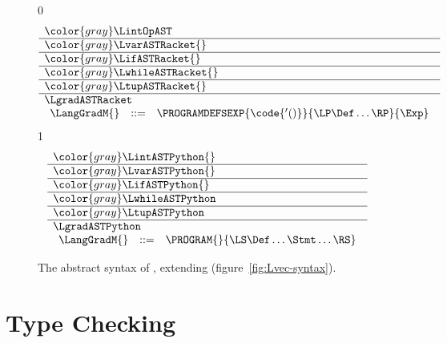 \documentclass[7x10]{TimesAPriori_MIT}%
\newcommand{\gray}[1]{{\color{gray} #1}}
\def\racketEd{0}
\def\pythonEd{1}
\def\edition{1}
\newcommand{\pythonColor}[0]{}
\numberwithin{theorem}{chapter}
\numberwithin{definition}{chapter}
\numberwithin{equation}{chapter}
\begin{document}
\begin{figure}[tbp]
\centering
\begin{tcolorbox}[colback=white]
    \small
{\if\edition\racketEd
\[
\begin{array}{l}
  \gray{\LintOpAST} \\ \hline
  \gray{\LvarASTRacket{}} \\ \hline
  \gray{\LifASTRacket{}} \\ \hline
  \gray{\LwhileASTRacket{}} \\ \hline
  \gray{\LtupASTRacket{}} \\ \hline
  \LgradASTRacket \\
\begin{array}{lcl}
  \LangGradM{} &::=& \PROGRAMDEFSEXP{\code{'()}}{\LP\Def\ldots\RP}{\Exp}
\end{array}
\end{array}
\]
\fi}
{\if\edition\pythonEd\pythonColor
\[
\begin{array}{l}
  \gray{\LintASTPython{}} \\ \hline
  \gray{\LvarASTPython{}} \\ \hline
  \gray{\LifASTPython{}} \\ \hline
  \gray{\LwhileASTPython} \\ \hline
  \gray{\LtupASTPython} \\   \hline
  \LgradASTPython \\
  \begin{array}{lcl}
    \LangGradM{} &::=& \PROGRAM{}{\LS \Def \ldots \Stmt \ldots \RS}
  \end{array}
\end{array}
\]
\fi}
\end{tcolorbox}

\caption{The abstract syntax of \LangGrad{}, extending \LangVec{} (figure~\ref{fig:Lvec-syntax}).}
\label{fig:Lgrad-syntax}
\end{figure}




\section{Type Checking \LangGrad{}}
\label{sec:gradual-type-check}
\end{document}
